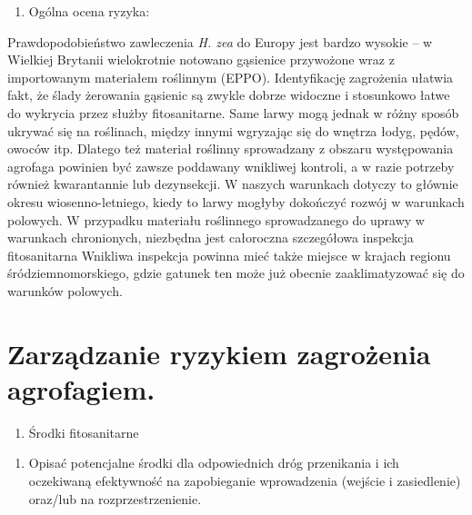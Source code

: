 \documentclass[polish,a4paper]{article}
\providecommand{\tightlist}{%
  \setlength{\itemsep}{0pt}\setlength{\parskip}{0pt}}
\begin{document}
\begin{enumerate}
\def\labelenumi{(\arabic{enumi})}
\setcounter{enumi}{15}
\tightlist
\item
  Ogólna ocena ryzyka:
\end{enumerate}

Prawdopodobieństwo zawleczenia \emph{H. zea} do Europy jest bardzo
wysokie -- w Wielkiej Brytanii wielokrotnie notowano gąsienice
przywożone wraz z importowanym materiałem roślinnym (EPPO).
Identyfikację zagrożenia ułatwia fakt, że ślady żerowania gąsienic są
zwykle dobrze widoczne i stosunkowo łatwe do wykrycia przez służby
fitosanitarne. Same larwy mogą jednak w różny sposób ukrywać się na
roślinach, między innymi wgryzając się do wnętrza łodyg, pędów, owoców
itp. Dlatego też materiał roślinny sprowadzany z obszaru występowania
agrofaga powinien być zawsze poddawany wnikliwej kontroli, a w razie
potrzeby również kwarantannie lub dezynsekcji. W naszych warunkach
dotyczy to głównie okresu wiosenno-letniego, kiedy to larwy mogłyby
dokończyć rozwój w warunkach polowych. W przypadku materiału roślinnego
sprowadzanego do uprawy w warunkach chronionych, niezbędna jest
całoroczna szczegółowa inspekcja fitosanitarna Wnikliwa inspekcja
powinna mieć także miejsce w krajach regionu śródziemnomorskiego, gdzie
gatunek ten może już obecnie zaaklimatyzować się do warunków polowych.

\part{Zarządzanie ryzykiem zagrożenia
agrofagiem.}\label{part-zarzadzanie-ryzykiem-zagrozenia-agrofagiem.}

\begin{enumerate}
\def\labelenumi{(\arabic{enumi})}
\setcounter{enumi}{16}
\tightlist
\item
  Środki fitosanitarne
\end{enumerate}

\begin{enumerate}
\def\labelenumi{\Roman{enumi})}
\tightlist
\item
  Opisać potencjalne środki dla odpowiednich dróg przenikania i ich
  oczekiwaną efektywność na zapobieganie wprowadzenia (wejście i
  zasiedlenie) oraz/lub na rozprzestrzenienie.
\end{enumerate}
\end{document}
